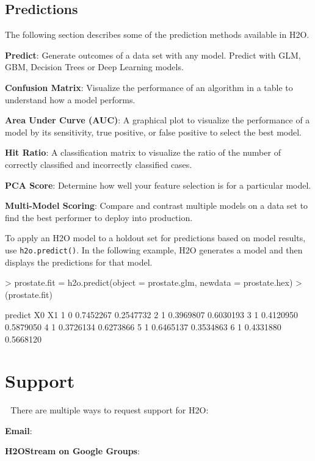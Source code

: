 \documentclass[11pt]{article}
\begin{document}
\subsection{Predictions}

The following section describes some of the prediction methods available in H2O. 

{\textbf{Predict}}: Generate outcomes of a data set with any model. Predict with GLM, GBM, Decision Trees or Deep Learning models.\bigskip

{\textbf{Confusion Matrix}}: Visualize the performance of an algorithm in a table to understand how a model performs.\bigskip

{\textbf{Area Under Curve (AUC)}}: A graphical plot to visualize the performance of a model by its sensitivity, true positive, or false positive to select the best model.\bigskip

{\textbf{Hit Ratio}}: A classification matrix to visualize the ratio of the number of correctly classified and incorrectly classified cases.\bigskip

{\textbf{PCA Score}}: Determine how well your feature selection is for a particular model.\bigskip

{\textbf{Multi-Model Scoring}}: Compare and contrast multiple models on a data set to find the best performer to deploy into production. \newpage

To apply an H2O model to a holdout set for predictions based on model results, use {\texttt{h2o.predict()}}.  In the following example, H2O generates a model and then displays the predictions for that model. 
\begin{spverbatim}
> prostate.fit = h2o.predict(object = prostate.glm, newdata = prostate.hex)
> (prostate.fit)

predict        X0        X1
      1       0 0.7452267 0.2547732
      2       1 0.3969807 0.6030193
      3       1 0.4120950 0.5879050
      4       1 0.3726134 0.6273866
      5       1 0.6465137 0.3534863
      6       1 0.4331880 0.5668120
\end{spverbatim}


\section{Support} 
There are multiple ways to request support for H2O: \bigskip

{\textbf{Email}}: {}

{\textbf{H2OStream on Google Groups}}: {} 
\end{document}
